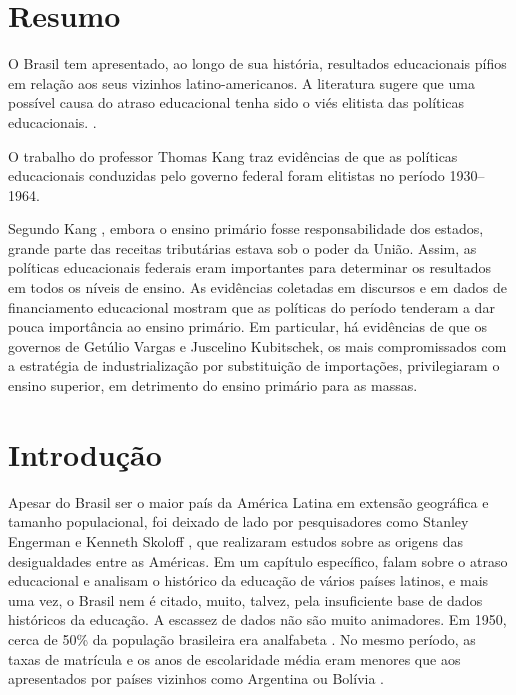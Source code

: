 \documentclass[a4paper,12pt]{article}
\begin{document}


\newpage

\thispagestyle{empty}

\tableofcontents

\newpage

\section*{Resumo}

\justifying

O Brasil tem apresentado, ao longo de sua história, resultados educacionais pífios em relação aos seus vizinhos latino-americanos.
A literatura sugere que uma possível causa do atraso educacional tenha sido o viés elitista das políticas educacionais. \cite{kang}.

O trabalho do professor Thomas Kang traz evidências de que as políticas educacionais conduzidas pelo governo federal foram elitistas no período 1930–1964.

Segundo Kang \cite*{kang}, embora o ensino primário fosse responsabilidade dos estados,
grande parte das receitas tributárias estava sob o poder da União. Assim, as políticas educacionais federais eram importantes para determinar os resultados em todos os níveis de ensino.
As evidências coletadas em discursos e em dados de financiamento educacional mostram que as políticas do período tenderam a dar pouca importância ao ensino primário.
Em particular, há evidências de que os governos de Getúlio Vargas e Juscelino Kubitschek, os mais compromissados com a estratégia de industrialização por substituição de importações, privilegiaram o ensino superior, em detrimento do ensino primário para as massas.

\section*{Introdução}

Apesar do Brasil ser o maior país da América Latina em extensão geográfica e tamanho populacional,
foi deixado de lado por pesquisadores como Stanley Engerman e Kenneth Skoloff \cite*{NBERenge11-1,NBERh0066},
que realizaram estudos sobre as origens das desigualdades entre as Américas.
Em um capítulo específico, falam sobre o atraso educacional e analisam o histórico da educação de vários países latinos,
e mais uma vez, o Brasil nem é citado, muito, talvez, pela insuficiente base de dados históricos da educação. A escassez de dados não são muito animadores.
Em 1950, cerca de 50\% da população brasileira era analfabeta \cite{kang}.
No mesmo período, as taxas de matrícula e os anos de escolaridade média eram menores que aos apresentados por países vizinhos como Argentina ou Bolívia \cite{astorga}.
\end{document}
